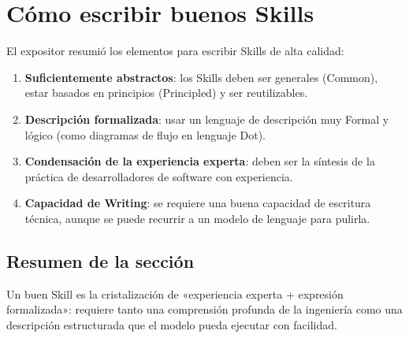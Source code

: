\section{Cómo escribir buenos Skills}

El expositor resumió los elementos para escribir Skills de alta calidad:

\begin{enumerate}
    \item \textbf{Suficientemente abstractos}: los Skills deben ser generales (Common), estar basados en principios (Principled) y ser reutilizables.
    \item \textbf{Descripción formalizada}: usar un lenguaje de descripción muy Formal y lógico (como diagramas de flujo en lenguaje Dot).
    \item \textbf{Condensación de la experiencia experta}: deben ser la síntesis de la práctica de desarrolladores de software con experiencia.
    \item \textbf{Capacidad de Writing}: se requiere una buena capacidad de escritura técnica, aunque se puede recurrir a un modelo de lenguaje para pulirla.
\end{enumerate}

\subsection{Resumen de la sección}

Un buen Skill es la cristalización de «experiencia experta + expresión formalizada»: requiere tanto una comprensión profunda de la ingeniería como una descripción estructurada que el modelo pueda ejecutar con facilidad.


